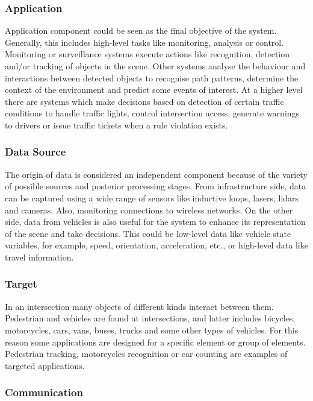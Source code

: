 \subsubsection{Application}

Application component could be seen as the final objective of the system. Generally, this includes high-level tasks like monitoring, analysis or control. Monitoring or surveillance systems execute actions like recognition, detection and/or tracking of objects in the scene. 
Other systems analyse the behaviour and interactions between detected objects to recognise path patterns, determine the context of the environment and predict some events of interest. At a higher level there are systems which make decisions based on detection of certain traffic conditions to handle traffic lights, control intersection access, generate warnings to drivers or issue traffic tickets when a rule violation exists.

\subsubsection{Data Source}

The origin of data is considered an independent component because of the variety of possible sources and posterior processing stages. From infrastructure side, data can be captured using a wide range of sensors like inductive loops, lasers, lidars and cameras. Also, monitoring connections to wireless networks. On the other side, data from vehicles is also useful for the system to enhance its representation of the scene and take decisions. This could be low-level data like vehicle state variables, for example, speed, orientation, acceleration, etc., or high-level data like travel information.


\subsubsection{Target}

In an intersection many objects of different kinds interact between them. Pedestrian and vehicles are found at intersections, and latter includes bicycles, motorcycles, cars, vans, buses, trucks and some other types of vehicles. For this reason some applications are designed for a specific element or group of elements. Pedestrian tracking, motorcycles recognition or car counting are examples of targeted applications.

\subsubsection{Communication}

